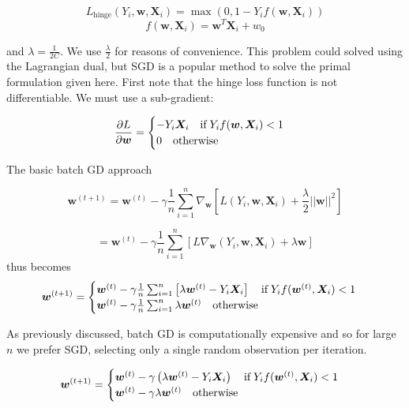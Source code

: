 \documentclass{article}
\begin{document}
$$
L_{\mathrm{hinge}}(Y_i, \bm{w}, \bm{X}_i) = \max(0, 1 - Y_i
f(\bm{w}, \bm{X}_i))
$$
$$
f(\bm{w}, \bm{X}_i) = \bm{w}^T\bm{X}_i + w_0
$$

and
$\lambda=\frac{1}{2C}$. We use $\frac{\lambda}{2}$ for reasons of
convenience. This problem could solved using the Lagrangian dual, but SGD is a
popular method to solve the primal formulation given here. First note
that the hinge loss function is not differentiable. We must use a sub-gradient:

\begin{equation}
	\frac{\partial L}{\partial \bm{w}} = 
	\begin{cases}
		-Y_i \bm{X}_i \quad \mathrm{if} \hspace{0.2em} Y_if(\bm{w}, \bm{X}_i) < 1\\
		0 \quad \mathrm{otherwise} \\
	\end{cases}
\end{equation}

The basic batch GD approach

$$
	\bm{w}^{(t+1)} = \bm{w}^{(t)} - \gamma \frac{1}{n} \sum_{i=1}^n
	\nabla_{\bm{w}} \left[ L(Y_i, \bm{w},
	\bm{X}_i) + \frac{\lambda}{2}
||\bm{w}||^2\right]
$$

$$
	= \bm{w}^{(t)} - \gamma \frac{1}{n} \sum_{i=1}^n
	 \left[ L\nabla_{\bm{w}} (Y_i, \bm{w},
	\bm{X}_i) + \lambda \bm{w} \right]
$$
thus becomes
\begin{equation}
	\bm{w}^{(t+1)} = 
	\begin{cases}
		\bm{w}^{(t)} - \gamma \frac{1}{n} \sum_{i=1}^n
		\left[
			\lambda \bm{w}^{(t)} - Y_i\bm{X}_i
		\right]
		\quad \mathrm{if} \hspace{0.2em} Y_if(\bm{w}^{(t)}, \bm{X}_i) < 1 \\

		\bm{w}^{(t)} - \gamma \frac{1}{n} \sum_{i=1}^n
		\lambda \bm{w}^{(t)} 
		\quad \textrm{otherwise} \\

	\end{cases}
\end{equation}

As previously discussed, batch GD is computationally expensive and
so for large $n$ we prefer SGD, selecting only a single random
observation per iteration.

\begin{equation}
	\bm{w}^{(t+1)} = 
	\begin{cases}
		\bm{w}^{(t)} - \gamma 
		\left(
			\lambda \bm{w}^{(t)} - Y_i\bm{X}_i
		\right)
		\quad \mathrm{if} \hspace{0.2em} Y_if(\bm{w}^{(t)}, \bm{X}_i) < 1 \\

		\bm{w}^{(t)} - \gamma 
		\lambda \bm{w}^{(t)} 
		\quad \textrm{otherwise} \\

	\end{cases}
\end{equation}
\end{document}
